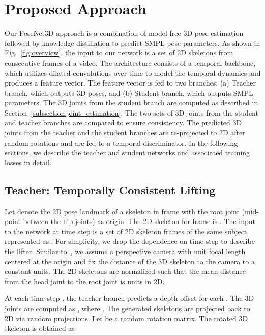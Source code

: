 \documentclass[10pt,twocolumn,letterpaper]{article}
\begin{document}
 


\section{Proposed Approach}

Our PoseNet3D approach is a combination of model-free 3D pose estimation followed by knowledge distillation to predict SMPL pose parameters. As shown in Fig.~\ref{fig:overview}, the input to our network is a set of  2D skeletons from  consecutive frames of a video. The architecture consists of a temporal backbone, which utilizes dilated convolutions over time to model the temporal dynamics and produces a feature vector. The feature vector is fed to two branches: (a) Teacher branch, which outputs 3D poses, and (b) Student branch, which outputs SMPL parameters. The 3D joints from the student branch are computed as described in Section~\ref{subsection:joint_estimation}. The two sets of 3D joints from the student and teacher branches are compared to ensure consistency. The predicted 3D joints from the teacher and the student branches are re-projected to 2D after random rotations and are fed to a temporal discriminator. In the following sections, we describe the teacher and student networks and associated training losses in detail.

\subsection{Teacher: Temporally Consistent Lifting}
\label{section:temporal_lifting}

Let  denote the  2D pose landmark of a skeleton in frame  with the root joint (mid-point between the hip joints) as origin. The 2D skeleton for frame  is . The input to the network at time step  is a set of  2D skeleton frames of the same subject, represented as .
For simplicity, we drop the dependence on time-step to describe the lifter. Similar to~\cite{chingCVPR2019}, we assume a perspective camera with unit focal length centered at the origin and fix the distance of the 3D skeleton to the camera to a constant  units. The 2D skeletons are normalized such that the mean distance from the head joint to the root
joint is  units in 2D.  


At each time-step , the teacher branch predicts a depth offset  for each . The 3D joints are computed as , where . The generated skeletons are projected back to 2D via random projections. Let  be a random rotation matrix. The rotated 3D skeleton  is obtained as
\end{document}
